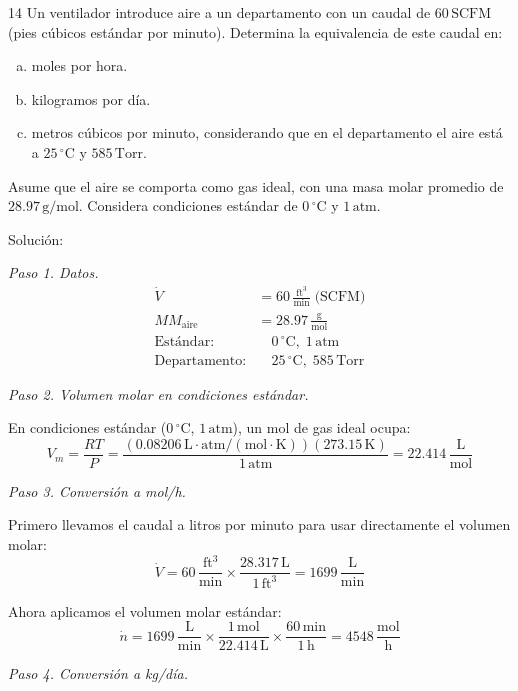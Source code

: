 \begin{exercise}{14}{}
Un ventilador introduce aire a un departamento con un caudal de
$60\,\mathrm{SCFM}$ (pies cúbicos estándar por minuto). Determina la
equivalencia de este caudal en:

\begin{enumerate}[a)]
    \item moles por hora.
    \item kilogramos por día.
    \item metros cúbicos por minuto, considerando que en el
    departamento el aire está a $25\,^\circ$C y $585\,\mathrm{Torr}$.
\end{enumerate}

Asume que el aire se comporta como gas ideal, con una masa molar
promedio de $28.97\,\mathrm{g/mol}$. Considera condiciones estándar de
$0\,^\circ$C y $1\,\mathrm{atm}$.

Solución:

\textit{Paso 1. Datos.}
\begin{align*}
\dot{V} &= 60\,\frac{\mathrm{ft^3}}{\mathrm{min}} \;\text{(SCFM)} \\[4pt]
MM_{\text{aire}} &= 28.97\,\frac{\mathrm{g}}{\mathrm{mol}} \\[4pt]
\text{Estándar:} &\quad 0\,^\circ\mathrm{C},\; 1\,\mathrm{atm} \\[4pt]
\text{Departamento:} &\quad 25\,^\circ\mathrm{C},\; 585\,\mathrm{Torr}
\end{align*}

\textit{Paso 2. Volumen molar en condiciones estándar.}

En condiciones estándar ($0\,^\circ$C, $1\,\mathrm{atm}$), un mol de
gas ideal ocupa:
\[
V_m = \frac{RT}{P}
= \frac{(0.08206\,\mathrm{L\cdot atm/(mol\cdot K)})(273.15\,\mathrm{K})}{1\,\mathrm{atm}}
= 22.414\,\frac{\mathrm{L}}{\mathrm{mol}}
\]

\textit{Paso 3. Conversión a mol/h.}

Primero llevamos el caudal a litros por minuto para usar directamente
el volumen molar:
\[
\dot{V} = 60\,\frac{\mathrm{ft^3}}{\mathrm{min}}
\times \frac{28.317\,\mathrm{L}}{1\,\mathrm{ft^3}}
= 1699\,\frac{\mathrm{L}}{\mathrm{min}}
\]

Ahora aplicamos el volumen molar estándar:
\[
\dot{n} = 1699\,\frac{\mathrm{L}}{\mathrm{min}}
\times \frac{1\,\mathrm{mol}}{22.414\,\mathrm{L}}
\times \frac{60\,\mathrm{min}}{1\,\mathrm{h}}
= 4548\,\frac{\mathrm{mol}}{\mathrm{h}}
\]

\textit{Paso 4. Conversión a kg/día.}


\end{exercise}
